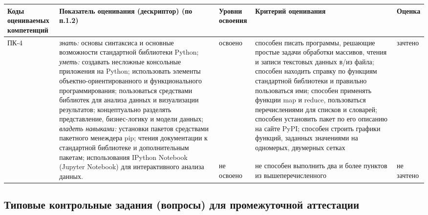\documentclass[a4paper,12pt]{article}
\begin{document}
\begin{longtable}{|p{15mm}|p{53mm}|p{16mm}|p{43mm}|p{14mm}|}
\hline
  \centering\small Коды оцениваемых компетенций
& \centering Показатель оценивания (дескриптор) (по п.1.2) 
& \centering\small Уровни освоения 
& \centering Критерий оценивания 
& \centering\small\arraybackslash Оценка
\\
\hline

\multirow{2}{15mm}{ПК-4}
&
\multirow{2}{53mm}{\parbox{53mm}{%
\vrule width 0pt height 10pt \emph{знать:}\newline
основы синтаксиса и основные возможности стандартной библиотеки Python; \newline
\emph{уметь:}\newline
создавать несложные консольные приложения на Python; использовать элементы объект\-но-ориен\-ти\-ро\-ван\-но\-го и функционального программирования; пользоваться средствами библиотек для анализа данных и визуализации результатов; концептуально разделять представление, бизнес-логику и модели данных; \newline
\emph{владеть навыками:}\newline
установки пакетов средствами пакетного менеждера pip; чтения документации к стандартной библиотеке и дополнительным пакетам; использования IPython Notebook (Jupyter Notebook) для интерактивного анализа данных. 
}}
& 
освоено & способен писать программы, решающие простые задачи обработки массивов,
чтения и записи текстовых данных в/из файла; способен находить справку
по функциям стандартной библиотеки и правильно пользоваться ими;
способен применять функции map и reduce, пользоваться перечислениями
для списков и словарей; способен установить пакет по его описанию на сайте PyPI;
способен строить графики функций, заданных   значениями на одномерых, двумерных сетках & зачтено 
\\ 

\cline{3-5}
& & не освоено & не способен выполнить два и более пунктов из вышеперечисленного\linebreak~\linebreak & не зачтено 
\\

\hline

\end{longtable}



\subsection{Типовые контрольные задания (вопросы) для промежуточной аттестации}
\end{document}
